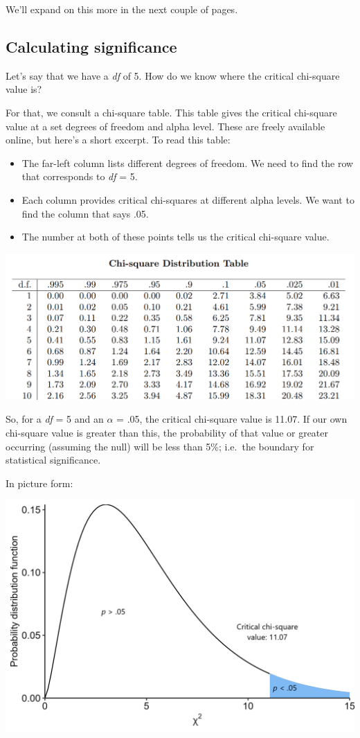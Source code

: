 \documentclass[
]{book}
\providecommand{\tightlist}{%
  \setlength{\itemsep}{0pt}\setlength{\parskip}{0pt}}
\begin{document}
We'll expand on this more in the next couple of pages.

\hypertarget{calculating-significance}{%
\subsection{Calculating significance}\label{calculating-significance}}

Let's say that we have a \emph{df} of 5. How do we know where the critical chi-square value is?

For that, we consult a chi-square table. This table gives the critical chi-square value at a set degrees of freedom and alpha level. These are freely available online, but here's a short excerpt. To read this table:

\begin{itemize}
\tightlist
\item
  The far-left column lists different degrees of freedom. We need to find the row that corresponds to \emph{df} = 5.
\item
  Each column provides critical chi-squares at different alpha levels. We want to find the column that says .05.
\item
  The number at both of these points tells us the critical chi-square value.
\end{itemize}

\includegraphics[width=15.92in]{img/w7_chisq_table}

So, for a \emph{df} = 5 and an \(\alpha\) = .05, the critical chi-square value is 11.07. If our own chi-square value is greater than this, the probability of that value or greater occurring (assuming the null) will be less than 5\%; i.e.~the boundary for statistical significance.

In picture form:

\includegraphics[width=25in]{img/w7_chisq_df_5}
\end{document}
